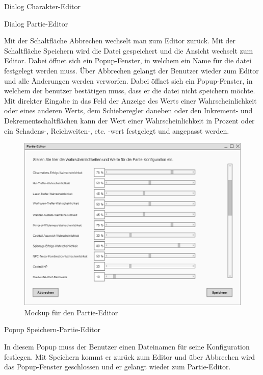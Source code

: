 Dialog \glqq{}Charakter-Editor\grqq{}

Dialog \glqq{}Partie-Editor\grqq{}

Mit der Schaltfläche \glqq{}Abbrechen\grqq{} wechselt man zum Editor zurück. Mit der Schaltfläche \glqq{}Speichern\grqq{} wird die Datei gespeichert und die Ansicht wechselt zum Editor. Dabei öffnet sich ein Popup-Fenster, in welchem ein Name für die datei festgelegt werden muss. Über Abbrechen gelangt der Benutzer wieder zum Editor und alle Änderungen werden verworfen. Dabei öffnet sich ein Popup-Fenster, in welchem der benutzer bestätigen muss, dass er die datei nicht speichern möchte. Mit direkter Eingabe in das Feld der Anzeige des Werts einer Wahrscheinlichkeit oder eines anderen Werts, dem Schieberegler daneben oder den Inkrement- und Dekrementschaltflächen kann der Wert einer Wahrscheinlichkeit in Prozent oder ein Schadens-, Reichweiten-, etc. -wert festgelegt und angepasst werden.

\begin{figure}[H]
  \centering
  \includegraphics[width=\textwidth]{Meilenstein03/Partie-Editor_Mockup.png}
  \caption{Mockup für den Partie-Editor}
\end{figure}

Popup \glqq{}Speichern-Partie-Editor\grqq{}

In diesem Popup muss der Benutzer einen Dateinamen für seine Konfiguration festlegen. Mit Speichern kommt er zurück zum Editor und über Abbrechen wird das Popup-Fenster geschlossen und er gelangt wieder zum Partie-Editor.

